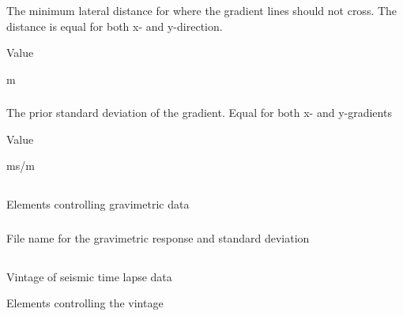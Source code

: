 \subsubsection{}
 \slist
   \item \Description The minimum lateral distance for where the gradient lines should not cross. The distance is equal for both x- and y-direction.
   \item \Argument Value
   \item {} m
 \elist

\subsubsection{}
 \slist
   \item \Description The prior standard deviation of the gradient. Equal for both x- and y-gradients
   \item \Argument Value
   \item {} ms/m
 \elist

\subsection{}
 \slist
\item \Description Elements controlling gravimetric data
   \item \Argument
   \item \Default
 \elist

\subsubsection{}
 \slist
   \item \Description File name for the gravimetric response and standard deviation
   \item \Argument
   \item \Default
 \elist

\subsection{}
 \slist
   \item \Description Vintage of seismic time lapse data
   \item \Argument Elements controlling the vintage
   \item \Default
 \elist
 
